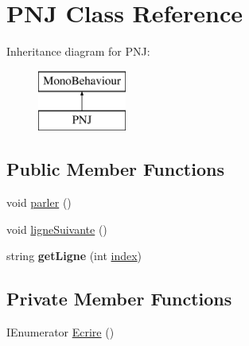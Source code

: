 \hypertarget{class_p_n_j}{}\section{P\+NJ Class Reference}
\label{class_p_n_j}
Inheritance diagram for P\+NJ\+:\begin{figure}[H]
\begin{center}
\leavevmode
\includegraphics[height=2.000000cm]{class_p_n_j}
\end{center}
\end{figure}
\subsection*{Public Member Functions}
\begin{DoxyCompactItemize}
\item 
void \mbox{\hyperlink{class_p_n_j_a388238d430ad9e0c0c3d0bbe4255759d}{parler}} ()
\item 
void \mbox{\hyperlink{class_p_n_j_ae036e7118940aef5eb3759dcb7c38932}{ligne\+Suivante}} ()
\item 
\mbox{\label{class_p_n_j_a9b4e6018b293c558404c18924913c783}} 
string {\bfseries get\+Ligne} (int \mbox{\hyperlink{class_p_n_j_a812687a1e8b5e0c95deb1a7c5ffd30dd}{index}})
\end{DoxyCompactItemize}
\subsection*{Private Member Functions}
\begin{DoxyCompactItemize}
\item 
I\+Enumerator \mbox{\hyperlink{class_p_n_j_a7e3c67f92110c15a5820be1996492257}{Ecrire}} ()
\end{DoxyCompactItemize}
